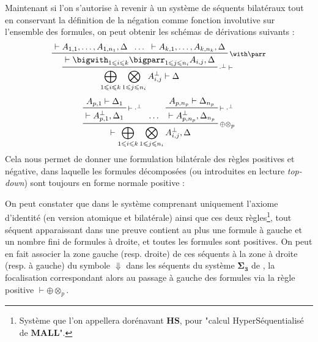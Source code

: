\documentclass[12pt]{report}
\newcommand{\seq}{\vdash}
\newcommand{\irule}[1]{\footnotesize$#1$}
\newcommand{\iruleL}[1]{\irule{{#1}\seq}}
\newcommand{\iruleR}[1]{\irule{\seq{#1}}}
\begin{document}
Maintenant si l'on s'autorise à revenir à un système de séquents bilatéraux tout en conservant la définition de la négation comme fonction involutive sur l'ensemble des formules, on peut obtenir les schémas de dérivations suivants :
\begin{displaymath}
	\prftree[r]{\iruleL{\cdot^\bot}}
		{\prftree[r]{\irule{\with\parr}}
			{\seq A_{1,1},\ldots,A_{1,n_1},\Delta}
			{\ldots}
			{\seq A_{k,1},\ldots,A_{k,n_k},\Delta}
			{\seq \bigwith_{1 \leqslant i \leqslant k} \bigparr_{1 \leqslant j \leqslant n_i} A_{i,j},\Delta}}
		{\bigoplus_{1 \leqslant i \leqslant k} \bigotimes_{1 \leqslant j \leqslant n_i} A_{i,j}^\bot \seq \Delta}
\end{displaymath}
\begin{displaymath}
	\prftree[r]{\irule{\oplus\otimes_p}}
		{\prftree[r]{\iruleR{\cdot^\bot}}
			{A_{p,1} \seq \Delta_1}
			{\seq A_{p,1}^\bot,\Delta_1}}
		{\ldots}
		{\prftree[r]{\iruleR{\cdot^\bot}}
			{A_{p,n_p} \seq \Delta_{n_p}}
			{\seq A_{p,n_p}^\bot,\Delta_{n_p}}}
		{\seq \bigoplus_{1 \leqslant i \leqslant k} \bigotimes_{1 \leqslant j \leqslant n_i} A_{i,j}^\bot,\Delta}
\end{displaymath}
Cela nous permet de donner une formulation bilatérale des règles positives et négative, dans laquelle les formules décomposées (ou introduites en lecture \textit{top-down}) sont toujours en forme normale positive :
On peut constater que dans le système comprenant uniquement l'axiome d'identité (en version atomique et bilatérale) ainsi que ces deux règles\footnote{Système que l'on appellera dorénavant $\mathbf{HS}$, pour "calcul HyperSéquentialisé de $\mathbf{MALL}$".}, tout séquent apparaissant dans une preuve contient au plus une formule à gauche et un nombre fini de formules à droite, et toutes les formules sont positives. On peut en fait associer la zone gauche (resp. droite) de ces séquents à la zone à droite (resp. à gauche) du symbole $\Downarrow$ dans les séquents du système $\bm{\Sigma_3}$ de \cite{And92}, la focalisation correspondant alors au passage à gauche des formules via la règle positive {\iruleR{\oplus\otimes_p}}.
\end{document}
